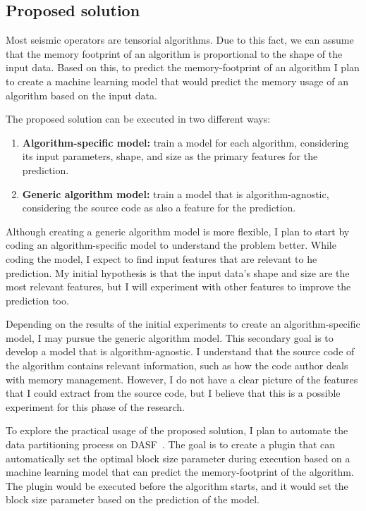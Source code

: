 \subsection{Proposed solution}
\label{subsec:proposed-solution}

Most seismic operators are tensorial algorithms.
Due to this fact, we can assume that the memory footprint of an algorithm is proportional to the shape of the input data.
Based on this, to predict the memory-footprint of an algorithm I plan to create a machine learning model that would predict the memory usage of an algorithm based on the input data. 

The proposed solution can be executed in two different ways:

\begin{enumerate}
  \item \textbf{Algorithm-specific model:} train a model for each algorithm, considering its input parameters, shape, and size as the primary features for the prediction.
  \item \textbf{Generic algorithm model:} train a model that is algorithm-agnostic, considering the source code as also a feature for the prediction.
\end{enumerate}

Although creating a generic algorithm model is more flexible, I plan to start by coding an algorithm-specific model to understand the problem better.
While coding the model, I expect to find input features that are relevant to he prediction.
My initial hypothesis is that the input data's shape and size are the most relevant features, but I will experiment with other features to improve the prediction too.

Depending on the results of the initial experiments to create an algorithm-specific model, I may pursue the generic algorithm model.
This secondary goal is to develop a model that is algorithm-agnostic.
I understand that the source code of the algorithm contains relevant information, such as how the code author deals with memory management.
However, I do not have a clear picture of the features that I could extract from the source code, but I believe that this is a possible experiment for this phase of the research.

To explore the practical usage of the proposed solution, I plan to automate the data partitioning process on \ac{DASF}~\cite{dasf}.
The goal is to create a plugin that can automatically set the optimal block size parameter during execution based on a machine learning model that can predict the memory-footprint of the algorithm.
The plugin would be executed before the algorithm starts, and it would set the block size parameter based on the prediction of the model.
